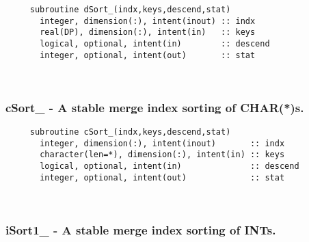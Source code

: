 \begin{verbatim} 
     subroutine dSort_(indx,keys,descend,stat)
       integer, dimension(:), intent(inout) :: indx
       real(DP), dimension(:), intent(in)   :: keys
       logical, optional, intent(in)        :: descend
       integer, optional, intent(out)       :: stat
 \end{verbatim}%
 
 
\mbox{}\hrulefill\ 
 

  \subsubsection{cSort\_ - A stable merge index sorting of CHAR(*)s.}

\begin{verbatim} 
     subroutine cSort_(indx,keys,descend,stat)
       integer, dimension(:), intent(inout)       :: indx
       character(len=*), dimension(:), intent(in) :: keys
       logical, optional, intent(in)              :: descend
       integer, optional, intent(out)             :: stat
 \end{verbatim}%
 
 
\mbox{}\hrulefill\ 
 
  \subsubsection{iSort1\_ - A stable merge index sorting of INTs.}

